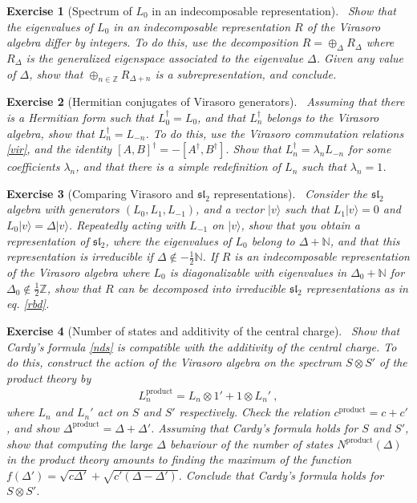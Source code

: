 \documentclass[12pt, a4paper, notitlepage, twoside]{report}
\numberwithin{equation}{section}
\theoremstyle{break}
\newtheorem{exo}{Exercise}[chapter]
\begin{document}
\begin{exo}[Spectrum of $L_0$ in an indecomposable representation]
 ~\label{exodiffint}
Show that the eigenvalues of $L_0$ in an indecomposable representation $R$ of the Virasoro algebra differ by integers.
To do this, use the decomposition $R=\oplus_\Delta R_\Delta$ where $R_\Delta$ is the generalized eigenspace associated to the eigenvalue $\Delta$.
Given any value of $\Delta$, show that  $\oplus_{n\in{\mathbb{Z}}} R_{\Delta+n}$ is a subrepresentation, and conclude. 
\end{exo}

\begin{exo}[Hermitian conjugates of Virasoro generators]
 ~\label{exolnd}
Assuming that there is a Hermitian form such that $L_0^\dagger = L_0$, and that $L_n^\dagger$ belongs to the Virasoro algebra, show that $L_n^\dagger = L_{-n}$. To do this, use the Virasoro commutation relations \eqref{vir}, and the identity $[A,B]^\dagger = -[A^\dagger, B^\dagger]$. Show that $L_n^\dagger = \lambda_n L_{-n}$ for some coefficients $\lambda_n$, and that there is a simple redefinition of $L_n$ such that $\lambda_n=1$.
\end{exo}

\begin{exo}[Comparing Virasoro and $\mathfrak{sl}_2$ representations]
 ~\label{exodis}
Consider the $\mathfrak{sl}_2$ algebra with generators $(L_0,L_1,L_{-1})$, and a vector $|v\rangle$ such that $L_1|v\rangle = 0 $ and $L_0|v\rangle = \Delta |v\rangle$.
Repeatedly acting with $L_{-1}$ on $|v\rangle$, show that you obtain a representation of $\mathfrak{sl}_2$, where the eigenvalues of $L_0$ belong to $\Delta+{\mathbb{N}}$, and that this representation is irreducible if $\Delta\notin -\frac12 \mathbb{N}$.
If $R$ is an indecomposable representation of the Virasoro algebra where $L_0$ is diagonalizable with eigenvalues in $\Delta_0+\mathbb{N}$ for $\Delta_0\notin\frac12 \mathbb{Z}$, show that $R$ can be decomposed into irreducible $\mathfrak{sl}_2$ representations as in eq. \eqref{rbd}.
\end{exo}


\begin{exo}[Number of states and additivity of the central charge]
 ~\label{exoacf} 
Show that Cardy's formula \eqref{nds} is compatible with the additivity of the central charge.
To do this, construct the action of the Virasoro algebra on the spectrum $S\otimes S'$ of the product theory by 
\begin{align}
 L_n^\text{product} = L_n\otimes 1' + 1\otimes L_n'\ ,
\end{align}
where $L_n$ and $L_n'$ act on $S$ and $S'$ respectively.
Check the relation $c^\text{product} = c+c'$, and show $\Delta^\text{product} = \Delta+\Delta'$.
Assuming that Cardy's formula holds for $S$ and $S'$, show that computing the large $\Delta$ behaviour of the number of states $N^\text{product}(\Delta)$ in the product theory amounts to finding the maximum of the function $f(\Delta') = \sqrt{c\Delta'} +\sqrt{c'(\Delta-\Delta')}$.
Conclude that Cardy's formula holds for $S\otimes S'$.
\end{exo}
\end{document}
